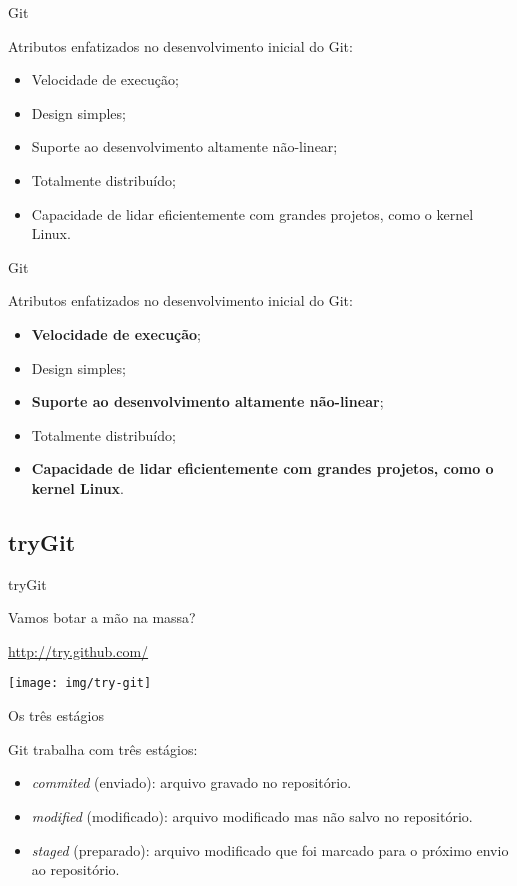 \documentclass[a4paper]{beamer}
\begin{document}
\begin{frame}{Git}

Atributos enfatizados no desenvolvimento inicial do Git:
\begin{itemize}
\item Velocidade de execução;
\item Design simples;
\item Suporte ao desenvolvimento altamente não-linear;
\item Totalmente distribuído;
\item Capacidade de lidar eficientemente com grandes projetos, como o kernel Linux.
\end{itemize}

\end{frame}

\begin{frame}{Git}

Atributos enfatizados no desenvolvimento inicial do Git:
\begin{itemize}
\item \textbf{Velocidade de execução};
\item Design simples;
\item \textbf{Suporte ao desenvolvimento altamente não-linear};
\item Totalmente distribuído;
\item \textbf{Capacidade de lidar eficientemente com grandes projetos, como o kernel Linux}.
\end{itemize}

\end{frame}

\subsection{tryGit}

\begin{frame}{tryGit}

Vamos botar a mão na massa?
\begin{center}
\url{http://try.github.com/}
\end{center}

\begin{center}
\texttt{[image: img/try-git]}
\end{center}

\end{frame}

\begin{frame}{Os três estágios}

Git trabalha com três estágios:
\begin{itemize}
\item \textit{commited} (enviado): arquivo gravado no repositório.
\item \textit{modified} (modificado): arquivo modificado mas não salvo no repositório.
\item \textit{staged} (preparado): arquivo modificado que foi marcado para o próximo envio ao repositório.
\end{itemize}

\end{frame}
\end{document}
